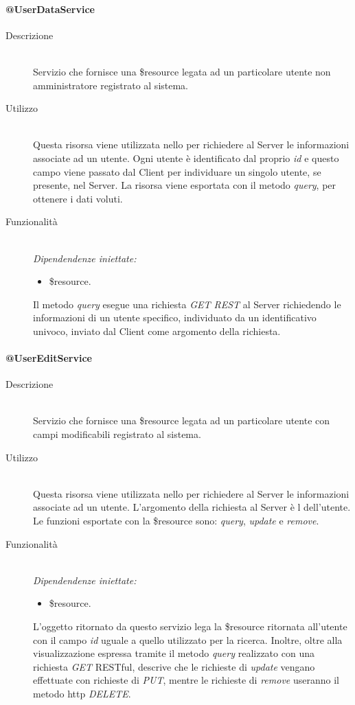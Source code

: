\paragraph{@UserDataService}
\begin{description}
 \item[Descrizione] \hfill \\
 Servizio che fornisce una \$resource legata ad un particolare utente non amministratore registrato al sistema.
 \item[Utilizzo] \hfill \\
 Questa risorsa viene utilizzata nello  per richiedere al Server le informazioni associate ad un utente. Ogni utente è identificato dal proprio \textit{id} e questo campo viene passato dal Client per individuare un singolo utente, se presente, nel Server. La risorsa viene esportata 
con il metodo \textit{query}, per ottenere i dati voluti.
 \item[Funzionalità] \hfill \\
 \emph{Dipendendenze iniettate:}
 \begin{itemize}
  \item \$resource.
 \end{itemize}
 Il metodo \textit{query} esegue una richiesta \textit{GET REST} al Server richiedendo le informazioni di un utente specifico, individuato da un identificativo univoco, inviato dal Client come argomento della richiesta.
\end{description}

\paragraph{@UserEditService}
\begin{description}
 \item[Descrizione] \hfill \\
 Servizio che fornisce una \$resource legata ad un particolare utente con campi modificabili registrato al sistema.
 \item[Utilizzo] \hfill \\
  Questa risorsa viene utilizzata nello  per richiedere al Server le informazioni associate ad un utente. L'argomento della richiesta al 
  Server è l dell'utente. Le funzioni esportate con la \$resource sono: \textit{query}, \textit{update} e 
  \textit{remove}.
 \item[Funzionalità] \hfill \\
 \emph{Dipendendenze iniettate:}
 \begin{itemize}
  \item \$resource.
 \end{itemize}
  L'oggetto ritornato da questo servizio lega la \$resource ritornata all'utente con il campo 
  \textit{id} uguale a quello utilizzato per la ricerca. Inoltre, oltre alla visualizzazione espressa tramite il metodo \textit{query} realizzato con una richiesta \textit{GET} RESTful, descrive che le richieste di \textit{update} vengano effettuate
 con richieste di \textit{PUT}, mentre le richieste di \textit{remove} useranno il metodo http \textit{DELETE}.
\end{description}


